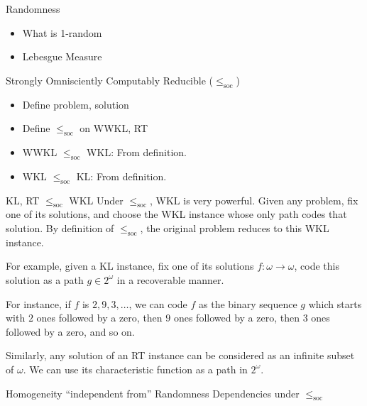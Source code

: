 \begin{frame}{Randomness}
  \begin{itemize}
    \item What is 1-random
    \item Lebesgue Measure
  \end{itemize}
\end{frame}

\begin{frame}{Strongly Omnisciently Computably Reducible
  ($\leq_{\text{soc}}$)}
  \begin{itemize}
    \item Define problem, solution
    \item Define $\leq_{\text{soc}}$ on WWKL, RT
    \item WWKL $\leq_{\text{soc}}$ WKL: From definition.
    \item WKL $\leq_{\text{soc}}$ KL: From definition.
  \end{itemize}
\end{frame}

\begin{frame}{KL, RT $\leq_{\text{soc}}$ WKL}
  Under $\leq_{\text{soc}}$, WKL is very powerful. Given any problem, fix
  one of its solutions, and choose the WKL instance whose only path codes
  that solution. By definition of $\leq_{\text{soc}}$, the original problem
  reduces to this WKL instance.

  \vspace{1em}
  For example, given a KL instance, fix one of its solutions
  $f:\omega\rightarrow\omega$, code this solution as a path $g\in2^\omega$
  in a recoverable manner.

  \vspace{1em}
  For instance, if $f$ is $2,9,3,\ldots$, we can code $f$ as the binary
  sequence $g$ which starts with $2$ ones followed by a zero, then $9$ ones
  followed by a zero, then $3$ ones followed by a zero, and so on.

  \vspace{1em}
  Similarly, any solution of an RT instance can be considered as an
  infinite subset of $\omega$. We can use its characteristic function as a
  path in $2^\omega$.
\end{frame}

\begin{frame}{Homogeneity ``independent from'' Randomness}
  Dependencies under $\leq_{\text{soc}}$
  \vspace{2em}

  \begin{center}
  \end{center}
\end{frame}
